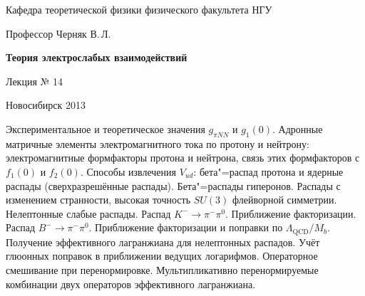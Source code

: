 \documentclass[12pt,pagesize,paper=192mm:108mm]{scrbook}
\begin{document}
\begin{titlepage}
\begin{center}
    Кафедра теоретической физики физического факультета НГУ
    \medskip

    \Large
    Профессор Черняк В.\,Л.
    \bigskip

    \huge
    \textbf{Теория электрослабых взаимодействий}
    \bigskip

    \Large
    Лекция № 14
    \vfill

    \vfill

\normalsize    Новосибирск 2013
  \smallskip

  \ccbysa
  \end{center}
\end{titlepage}
\newpage

\vspace*{-1em}
\begin{center}
 \vfill
  \begin{minipage}{0.66\linewidth}
    Экспериментальное и теоретическое значения $g_{\pi NN}$ и
    $g_1(0)$.  Адронные матричные элементы электромагнитного тока по
    протону и нейтрону: электромагнитные формфакторы протона и
    нейтрона, связь этих формфакторов с $f_1(0)$ и $f_2(0)$.  Способы
    извлечения $V_{ud}$: бета"=распад протона и ядерные распады
    (сверхразрешённые распады). Бета"=распады гиперонов.  Распады с
    изменением странности, высокая точность $SU(3)$ флейворной
    симметрии. Нелептонные слабые распады.  Распад
    $K^-\to\pi^-\pi^0$. Приближение факторизации.  Распад
    $B^-\to\pi^-\pi^0$. Приближение факторизации и поправки по
    $\Lambda_{\text{QCD}}/M_b$.  Получение эффективного лагранжиана
    для нелептонных распадов. Учёт глюонных поправок в приближении
    ведущих логарифмов.  Операторное смешивание при
    перенормировке. Мультипликативно перенормируемые комбинации двух
    операторов эффективного лагранжиана.
  \end{minipage}
  \vfill

\end{center}
\end{document}
